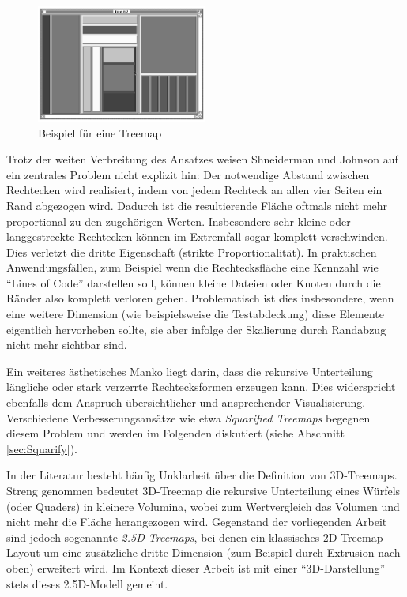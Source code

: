 \begin{figure}[ht]
    \centering
    \includegraphics[width=0.5\textwidth]{images/nestedTreemapDiagramm.png}
    \caption{Beispiel für eine Treemap}
    \label{fig:nestedTreemap}
\end{figure}

Trotz der weiten Verbreitung des Ansatzes weisen Shneiderman und Johnson auf ein zentrales Problem nicht explizit hin: Der notwendige Abstand zwischen Rechtecken wird realisiert, indem von jedem Rechteck an allen vier Seiten ein Rand abgezogen wird. Dadurch ist die resultierende Fläche oftmals nicht mehr proportional zu den zugehörigen Werten. Insbesondere sehr kleine oder langgestreckte Rechtecken können im Extremfall sogar komplett verschwinden. Dies verletzt die dritte Eigenschaft (strikte Proportionalität). In praktischen Anwendungsfällen, zum Beispiel wenn die Rechtecksfläche eine Kennzahl wie \enquote{Lines of Code} darstellen soll, können kleine Dateien oder Knoten durch die Ränder also komplett verloren gehen. Problematisch ist dies insbesondere, wenn eine weitere Dimension (wie beispielsweise die Testabdeckung) diese Elemente eigentlich hervorheben sollte, sie aber infolge der Skalierung durch Randabzug nicht mehr sichtbar sind.

Ein weiteres ästhetisches Manko liegt darin, dass die rekursive Unterteilung längliche oder stark verzerrte Rechtecksformen erzeugen kann. Dies widerspricht ebenfalls dem Anspruch übersichtlicher und ansprechender Visualisierung. Verschiedene Verbesserungsansätze wie etwa \textit{Squarified Treemaps} begegnen diesem Problem und werden im Folgenden diskutiert (siehe Abschnitt \ref{sec:Squarify}).

\smallskip

In der Literatur besteht häufig Unklarheit über die Definition von 3D-Treemaps. Streng genommen bedeutet 3D-Treemap die rekursive Unterteilung eines Würfels (oder Quaders) in kleinere Volumina, wobei zum Wertvergleich das Volumen und nicht mehr die Fläche herangezogen wird. Gegenstand der vorliegenden Arbeit sind jedoch sogenannte \textit{2.5D-Treemaps}, bei denen ein klassisches 2D-Treemap-Layout um eine zusätzliche dritte Dimension (zum Beispiel durch Extrusion nach oben) erweitert wird. Im Kontext dieser Arbeit ist mit einer \enquote{3D-Darstellung} stets dieses 2.5D-Modell gemeint.


